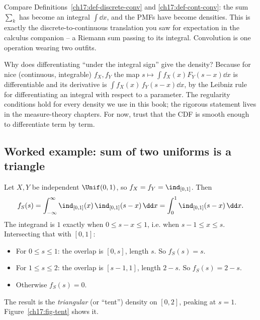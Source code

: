\begin{connectionbox}
Compare Definitions~\ref{ch17:def-discrete-conv} and
\ref{ch17:def-cont-conv}: the sum $\sum_k$ has become an integral
$\int \dd x$, and the PMFs have become densities. This is exactly the
discrete-to-continuous translation you saw for expectation in the calculus
companion -- a Riemann sum passing to its integral. Convolution is one
operation wearing two outfits.
\end{connectionbox}

\begin{whybox}
Why does differentiating ``under the integral sign'' give the density?
Because for nice (continuous, integrable) $f_X,f_Y$ the map
$s\mapsto \int f_X(x)F_Y(s-x)\dd x$ is differentiable and its derivative is
$\int f_X(x)\,f_Y(s-x)\dd x$, by the Leibniz rule for differentiating an
integral with respect to a parameter. The regularity conditions hold for
every density we use in this book; the rigorous statement lives in the
measure-theory chapters. For now, trust that the CDF is smooth enough to
differentiate term by term.
\end{whybox}

\subsection{Worked example: sum of two uniforms is a triangle}

Let $X,Y$ be independent $\Unif(0,1)$, so $f_X=f_Y=\ind_{[0,1]}$. Then
\[
f_S(s) = \int_{-\infty}^{\infty} \ind_{[0,1]}(x)\,\ind_{[0,1]}(s-x)\,\dd x
       = \int_0^1 \ind_{[0,1]}(s-x)\,\dd x.
\]
The integrand is $1$ exactly when $0\le s-x\le 1$, i.e. when
$s-1\le x\le s$. Intersecting that with $[0,1]$:
\begin{itemize}
  \item For $0\le s\le 1$: the overlap is $[0,s]$, length $s$. So $f_S(s)=s$.
  \item For $1\le s\le 2$: the overlap is $[s-1,1]$, length $2-s$. So $f_S(s)=2-s$.
  \item Otherwise $f_S(s)=0$.
\end{itemize}
The result is the \emph{triangular} (or ``tent'') density on $[0,2]$,
peaking at $s=1$. Figure~\ref{ch17:fig-tent} shows it.

